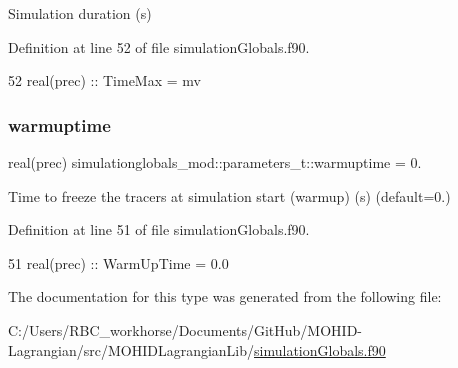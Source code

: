 Simulation duration (s) 



Definition at line 52 of file simulation\+Globals.\+f90.


\begin{DoxyCode}
52         \textcolor{keywordtype}{real(prec)}      :: TimeMax = mv              
\end{DoxyCode}
\mbox{\label{structsimulationglobals__mod_1_1parameters__t_acab4746165c72ab2947c178c95c1c577}} 
\subsubsection{\texorpdfstring{warmuptime}{warmuptime}}
{\footnotesize\ttfamily real(prec) simulationglobals\+\_\+mod\+::parameters\+\_\+t\+::warmuptime = 0.\hspace{0.3cm}{\ttfamily [private]}}



Time to freeze the tracers at simulation start (warmup) (s) (default=0.) 



Definition at line 51 of file simulation\+Globals.\+f90.


\begin{DoxyCode}
51         \textcolor{keywordtype}{real(prec)}      :: WarmUpTime = 0.0
\end{DoxyCode}


The documentation for this type was generated from the following file\+:\begin{DoxyCompactItemize}
\item 
C\+:/\+Users/\+R\+B\+C\+\_\+workhorse/\+Documents/\+Git\+Hub/\+M\+O\+H\+I\+D-\/\+Lagrangian/src/\+M\+O\+H\+I\+D\+Lagrangian\+Lib/\mbox{\hyperlink{simulation_globals_8f90}{simulation\+Globals.\+f90}}\end{DoxyCompactItemize}
